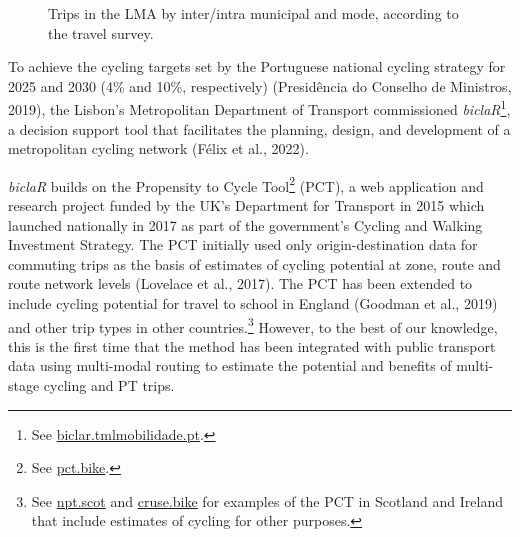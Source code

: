 \documentclass[review, doubleblind, 3p,
authoryear]{elsarticle} %
\begin{document}
\begin{figure}
\caption{\label{mododist}Trips in the LMA by inter/intra municipal and mode, according to the travel survey.}\label{fig:mododist}
\end{figure}

To achieve the cycling targets set by the Portuguese national cycling
strategy for 2025 and 2030 (4\% and 10\%, respectively) (Presidência do
Conselho de Ministros, 2019), the Lisbon's Metropolitan Department of
Transport commissioned \emph{biclaR}\footnote{See
  \href{https://biclar.tmlmobilidade.pt/}{biclar.tmlmobilidade.pt}.}, a
decision support tool that facilitates the planning, design, and
development of a metropolitan cycling network (Félix et al., 2022).

\emph{biclaR} builds on the Propensity to Cycle Tool\footnote{See
  \href{https://www.pct.bike/}{pct.bike}.} (PCT), a web application and
research project funded by the UK's Department for Transport in 2015
which launched nationally in 2017 as part of the government's Cycling
and Walking Investment Strategy. The PCT initially used only
origin-destination data for commuting trips as the basis of estimates of
cycling potential at zone, route and route network levels (Lovelace et
al., 2017). The PCT has been extended to include cycling potential for
travel to school in England (Goodman et al., 2019) and other trip types
in other countries.\footnote{See \href{https://www.npt.scot}{npt.scot}
  and \href{https://cruse.bike}{cruse.bike} for examples of the PCT in
  Scotland and Ireland that include estimates of cycling for other
  purposes.} However, to the best of our knowledge, this is the first
time that the method has been integrated with public transport data
using multi-modal routing to estimate the potential and benefits of
multi-stage cycling and PT trips.
\end{document}
